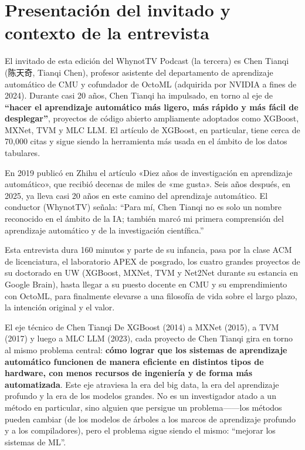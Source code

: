 \section{Presentación del invitado y contexto de la entrevista}

El invitado de esta edición del WhynotTV Podcast (la tercera) es Chen Tianqi (陈天奇, Tianqi Chen), profesor asistente del departamento de aprendizaje automático de CMU y cofundador de OctoML (adquirida por NVIDIA a fines de 2024). Durante casi 20 años, Chen Tianqi ha impulsado, en torno al eje de \textbf{``hacer el aprendizaje automático más ligero, más rápido y más fácil de desplegar''}, proyectos de código abierto ampliamente adoptados como XGBoost, MXNet, TVM y MLC LLM. El artículo de XGBoost, en particular, tiene cerca de 70,000 citas y sigue siendo la herramienta más usada en el ámbito de los datos tabulares.

En 2019 publicó en Zhihu el artículo «Diez años de investigación en aprendizaje automático», que recibió decenas de miles de «me gusta». Seis años después, en 2025, ya lleva casi 20 años en este camino del aprendizaje automático. El conductor (WhynotTV) señala: ``Para mí, Chen Tianqi no es solo un nombre reconocido en el ámbito de la IA; también marcó mi primera comprensión del aprendizaje automático y de la investigación científica.''

Esta entrevista dura 160 minutos y parte de su infancia, pasa por la clase ACM de licenciatura, el laboratorio APEX de posgrado, los cuatro grandes proyectos de su doctorado en UW (XGBoost, MXNet, TVM y Net2Net durante su estancia en Google Brain), hasta llegar a su puesto docente en CMU y su emprendimiento con OctoML, para finalmente elevarse a una filosofía de vida sobre el largo plazo, la intención original y el valor.

\begin{importantbox}{El eje técnico de Chen Tianqi}
De XGBoost (2014) a MXNet (2015), a TVM (2017) y luego a MLC LLM (2023), cada proyecto de Chen Tianqi gira en torno al mismo problema central: \textbf{cómo lograr que los sistemas de aprendizaje automático funcionen de manera eficiente en distintos tipos de hardware, con menos recursos de ingeniería y de forma más automatizada}. Este eje atraviesa la era del big data, la era del aprendizaje profundo y la era de los modelos grandes. No es un investigador atado a un método en particular, sino alguien que persigue un problema------los métodos pueden cambiar (de los modelos de árboles a los marcos de aprendizaje profundo y a los compiladores), pero el problema sigue siendo el mismo: ``mejorar los sistemas de ML''.
\end{importantbox}

